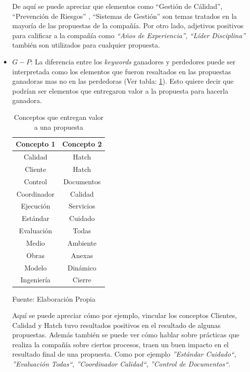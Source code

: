 \begin{itemize}
        De aquí se puede apreciar que elementos como ``Gestión de Cálidad'', ``Prevención de Riesgos'' , ``Sistemas de Gestión'' son temas tratados en la mayoría de las propuestas de la compañía. Por otro lado, adjetivos positivos para calificar a la compañía como \textit{``Años de Experiencia''}, \textit{``Líder Disciplina''} también son utilizados para cualquier propuesta.
        
        \item $G - P$: La diferencia entre los \textit{keywords} ganadores y perdedores puede ser interpretada como los elementos que fueron resaltados en las propuestas ganadoras mas no en las perdedoras (Ver tabla: \ref{table:Conceptos_con_valor}). Esto quiere decir que podrían ser elementos que entregaron valor a la propuesta para hacerla ganadora.
        
        \begin{table}[H]
        \centering
        \begin{tabular}{|c|c|}
        \hline
        \textbf{Concepto 1} & \textbf{Concepto 2} \\ \hline
        Calidad             & Hatch               \\ \hline
        Cliente             & Hatch               \\ \hline
        Control             & Documentos          \\ \hline
        Coordinador         & Calidad             \\ \hline
        Ejecución           & Servicios           \\ \hline
        Estándar            & Cuidado             \\ \hline
        Evaluación          & Todas               \\ \hline
        Medio               & Ambiente            \\ \hline
        Obras               & Anexas              \\ \hline
        Modelo              & Dinámico            \\ \hline
        Ingeniería          & Cierre              \\ \hline
        \end{tabular}
        \caption{\label{table:Conceptos_con_valor} Conceptos que entregan valor a una propuesta} Fuente: Elaboración Propia
        \end{table}
        
        Aquí se puede apreciar cómo por ejemplo, vincular los conceptos Clientes, Calidad y Hatch tuvo resultados positivos en el resultado de algunas propuestas. Además también se puede ver cómo hablar sobre prácticas que realiza la compañía sobre ciertos procesos, traen un buen impacto en el resultado final de una propuesta. Como por ejemplo \textit{''Estándar Cuidado``}, \textit{''Evaluación Todas``}, \textit{''Coordinador Calidad``}, \textit{''Control de Documentos``}.
        

\end{itemize}
